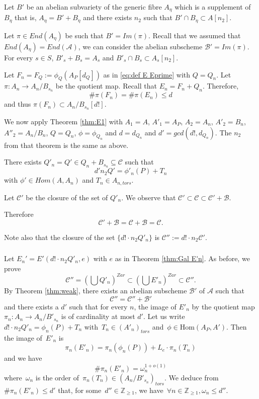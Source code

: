 \documentclass[12pt]{amsart}
\newcommand{\Hom}{\mbox{Hom}}
\newcommand{\Z}{{\mathbb Z}}
\begin{document}
Let $B'$ be an abelian subvariety of the generic fibre $A_{\eta}$ which is a supplement of $B_{\eta}$ that is,
$A_{\eta}= B' + B_{\eta}$ and there exists $n_2$ such that $B' \cap B_{\eta} \subset A[n_2]$.

Let $\pi \in End(A_{\eta})$ be such that $B'=Im(\pi)$.
Recall that we assumed that $End(A_{\eta})=End(\mathcal{A})$, we can consider the abelian subscheme 
$\mathcal{B'}=Im(\pi)$. For every $s \in S$, $B'_s + B_s = A_s$ and $B'_s \cap B_s \subset A_s[n_2]$.

 Let $F_n = F_Q:=\phi_Q(A_P[d_Q])$ as in \eqref{eq:def E Eprime} with $Q=Q_n$. Let 
$\pi : A_n \to A_n/B_{s_n}$ be the quotient map.
Recall that $E_n = F_n + Q_n$. Therefore,
$$
\# \pi(F_n) = \# \pi(E_n)\leq d
$$   
and thus $\pi(F_n) \subset A_n/B_{s_n}[d!]$.

We now apply Theorem \ref{thm:E1} with $A_1=A$, $A'_1=A_P$, $A_2=A_n$, $A'_2=B_n$, $A''_2=A_n/B_n$,
$Q=Q_n$, $\phi=\phi_{Q_n}$ and $d=d_{Q_n}$ and $d' = gcd(d!,d_{Q_n})$.
The $n_2$ from that theorem is the same as above.

There exists $Q'_n = Q' \in Q_n + B_{s_n} \subseteq \mathcal{C}$ such that
$$
d' n_2 Q' = \phi'_n (P) + T_n
$$
with $\phi' \in Hom(A, A_n)$ and $T_n \in A_{n, tors}$.

Let $\mathcal{C}'$ be the closure of the set of $Q'_n$. We observe that 
$\mathcal{C}' \subset \mathcal{C} \subset \mathcal{C}' + \mathcal{B}$.

Therefore
\[\mathcal{C}' + \mathcal{B} = \mathcal{C} + \mathcal{B}= \mathcal{C}.\]


Note also that the closure of the set $\{d!\cdot n_2 Q'_n\}$ is $ \mathcal{C}'':=d!\cdot n_2 \mathcal{C}'$.

\subsubsection{}

Let $E_n'= E'(d!\cdot n_2 Q'_n, e)$ with $e$ as in Theorem \ref{thm:Gal E'n}. 
As before, we prove
\[
\mathcal{C}''=(\bigcup Q'_n)^{Zar} \subset (\bigcup E'_n)^{Zar} \subset \mathcal{C}''.
\]
By Theorem \ref{thm:weak}, there exists an abelian subscheme $\mathcal{B'}$ of $\mathcal{A}$
such that
$$
\mathcal{C}'' = \mathcal{C}'' + \mathcal{B}'
$$
and there exists a $d'$ such that for every $n$, the image of $E'_n$ by the quotient map
$\pi_n:A_n \to A_n/B'_{s_n}$ is of cardinality at most $d'$. Let us write~$d!\cdot n_2 Q'_n=\phi_n(P)+T_n$
with~$T_n\in {(A'_n)}_{tors}$ and~$\phi\in \Hom(A_P,A')$. Then the image of~$E'_n$
is
\[
\pi_n(E'_n)=\pi_n(\phi_n(P))+L_e\cdot \pi_n(T_n)
\]
and we have
\[
\#\pi_n(E'_n)=\omega_n^{1+o(1)}
\]
where~$\omega_n$ is the order of~$\pi_n(T_n)\in (A_n/B'_{s_n})_{tors}$. We deduce from~$\#\pi_n(E'_n)\leq d'$
that, for some~$d''\in\Z_{\geq1}$, we have~$\forall n\in\Z_{\geq1},\omega_n\leq d''$.
\end{document}
